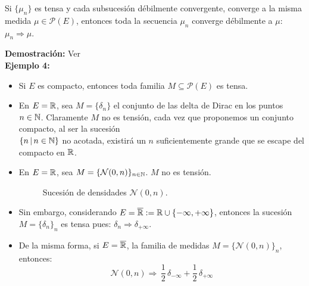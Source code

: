 \begin{cor} Si $\{\mu_n\}$ es tensa y cada subsucesión débilmente convergente, converge a la misma medida $\mu\in\mathcal{P}(E)$, entonces toda la secuencia $\mu_n$ converge débilmente a $\mu$: $\mu_n \Rightarrow \mu$.
\end{cor}
\textbf{Demostración:} Ver \cite[págs. 59,69]{Bill}\\\newline
\textbf{Ejemplo 4:}
\begin{itemize}
    \item Si $E$ es compacto, entonces toda familia $M\subseteq \mathcal{P}(E)$ es tensa.
    \item En $E=\mathbb R$, sea $M=\{\delta_n \}$ el conjunto de las delta de Dirac en los puntos $n\in\mathbb N$. Claramente $M$ no es tensión, cada vez que proponemos un conjunto compacto, al ser la sucesión \\$\{n\,|\, n\in\mathbb N\}$ no acotada, existirá un $n$ suficientemente grande que se escape del compacto en $\mathbb R$. 
    \item En $E=\mathbb R$, sea $M=\{\mathcal{N}(0,n)\}_{n\in\mathbb N}$. $M$ no es tensión.
\begin{figure}[H]
\centering
    \caption{Sucesión de densidades $\mathcal{N}(0,n)$.}
\end{figure}

    \item Sin embargo, considerando $E=\overline{\mathbb R}:=\mathbb R\cup \{-\infty ,+\infty\}$, entonces la sucesión $M=\{\delta_n \}_n$ es tensa pues: $\delta_n \Rightarrow \delta_{+\infty}$.
    
    \item De la misma forma, si $E=\overline{\mathbb R}$, la familia de medidas $M=\{\mathcal{N}(0,n)\}_n$, entonces:
    \[\mathcal{N}(0,n) \Rightarrow\,\frac{1}{2}\,\delta_{-\infty} + \frac{1}{2}\,\delta_{+\infty}\]
\end{itemize}
